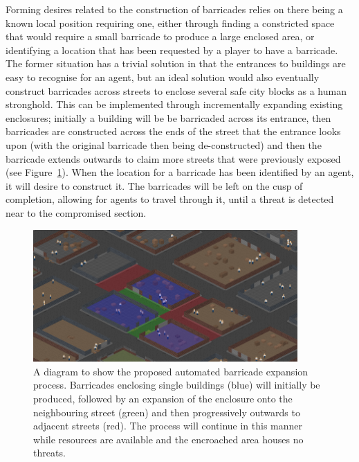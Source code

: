 \documentclass[12pt,a4paper]{article}
\begin{document}
Forming desires related to the construction of barricades relies on there being a known local position requiring one, either through finding a constricted space that would require a small barricade to produce a large enclosed area, or identifying a location that has been requested by a player to have a barricade. The former situation has a trivial solution in that the entrances to buildings are easy to recognise for an agent, but an ideal solution would also eventually construct barricades across streets to enclose several safe city blocks as a human stronghold. This can be implemented through incrementally expanding existing enclosures; initially a building will be be barricaded across its entrance, then barricades are constructed across the ends of the street that the entrance looks upon (with the original barricade then being de-constructed) and then the barricade extends outwards to claim more streets that were previously exposed (see Figure~\ref{fig:barricades}). When the location for a barricade has been identified by an agent, it will desire to construct it. The barricades will be left on the cusp of completion, allowing for agents to travel through it, until a threat is detected near to the compromised section.

\begin{figure}[h]
\centering
\includegraphics[width=0.9\textwidth]{barricades}
\caption{A diagram to show the proposed automated barricade expansion process. Barricades enclosing single buildings (blue) will initially be produced, followed by an expansion of the enclosure onto the neighbouring street (green) and then progressively outwards to adjacent streets (red). The process will continue in this manner while resources are available and the encroached area houses no threats.}
\label{fig:barricades}
\end{figure}
\end{document}
